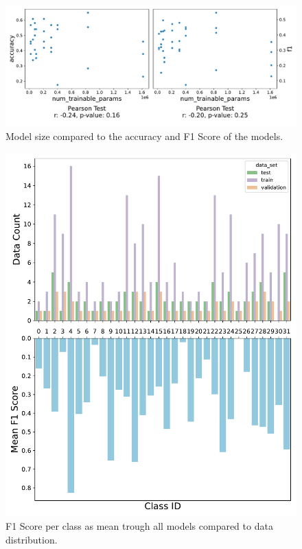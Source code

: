 \begin{figure}[h!]
    \centering
    \captionsetup{width=.7\linewidth}
    \includegraphics[width=1\textwidth]{figures/hyperparameters_scatterplot.pdf}
    \caption{Model size compared to the accuracy and F1 Score of the models.}
    \label{fig:hyperparameters_scatterplot}
\end{figure}

\begin{figure}[h!]
    \centering
    \captionsetup{width=.7\linewidth}
    \includegraphics[width=1\textwidth]{figures/f1_per_class.pdf}
    \caption{F1 Score per class as mean trough all models compared to data distribution.}
    \label{fig:f1_per_class}
\end{figure}



